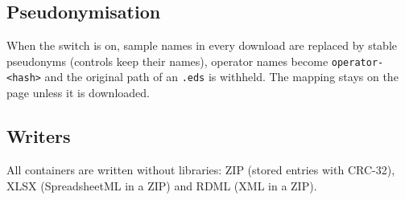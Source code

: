 
\subsection*{Pseudonymisation}
When the switch is on, sample names in every download are replaced by stable pseudonyms (controls keep their names), operator
names become \texttt{operator-<hash>} and the original path of an \texttt{.eds} is withheld. The mapping stays on the page unless
it is downloaded.




\subsection*{Writers}
All containers are written without libraries: ZIP (stored entries with CRC-32), XLSX (SpreadsheetML in a ZIP) and RDML (XML in a ZIP).










